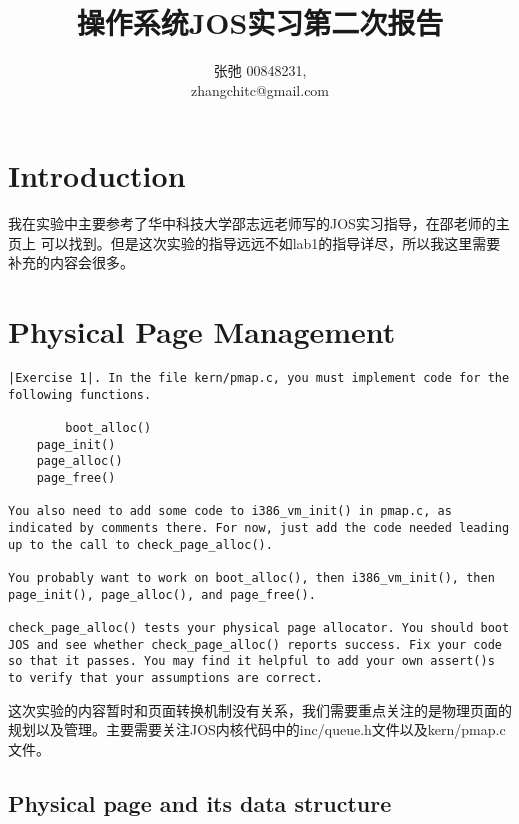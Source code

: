 \documentclass{article}
\begin{document}
\begin{CJK*}{UTF8}{gkai}

\title{操作系统JOS实习第二次报告}
\author{张弛 \hspace{1ex} 00848231, \\
        zhangchitc@gmail.com}

\maketitle
\tableofcontents
\newpage

\section{Introduction}

我在实验中主要参考了华中科技大学邵志远老师写的JOS实习指导，在邵老师的主页上 可以找到。但是这次实验的指导远远不如lab1的指导详尽，所以我这里需要补充的内容会很多。

\section{Physical Page Management}


\begin{lstlisting}[style=exercise]
|Exercise 1|. In the file kern/pmap.c, you must implement code for the following functions.

        boot_alloc()
	page_init()
	page_alloc()
	page_free()
	
You also need to add some code to i386_vm_init() in pmap.c, as indicated by comments there. For now, just add the code needed leading up to the call to check_page_alloc().

You probably want to work on boot_alloc(), then i386_vm_init(), then page_init(), page_alloc(), and page_free().

check_page_alloc() tests your physical page allocator. You should boot JOS and see whether check_page_alloc() reports success. Fix your code so that it passes. You may find it helpful to add your own assert()s to verify that your assumptions are correct.
\end{lstlisting}

这次实验的内容暂时和页面转换机制没有关系，我们需要重点关注的是物理页面的规划以及管理。主要需要关注JOS内核代码中的inc/queue.h文件以及kern/pmap.c文件。

\subsection{Physical page and its data structure}


\end{CJK*}
\end{document}
